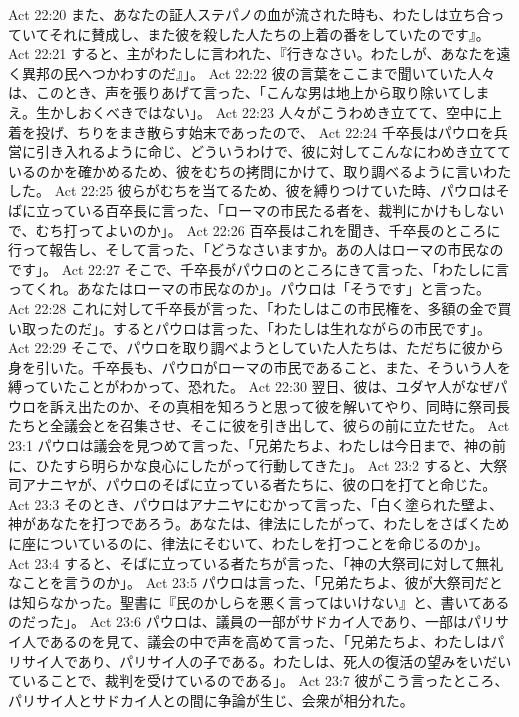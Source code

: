 Act 22:20  また、あなたの証人ステパノの血が流された時も、わたしは立ち合っていてそれに賛成し、また彼を殺した人たちの上着の番をしていたのです』。
Act 22:21  すると、主がわたしに言われた、『行きなさい。わたしが、あなたを遠く異邦の民へつかわすのだ』」。
Act 22:22  彼の言葉をここまで聞いていた人々は、このとき、声を張りあげて言った、「こんな男は地上から取り除いてしまえ。生かしおくべきではない」。
Act 22:23  人々がこうわめき立てて、空中に上着を投げ、ちりをまき散らす始末であったので、
Act 22:24  千卒長はパウロを兵営に引き入れるように命じ、どういうわけで、彼に対してこんなにわめき立てているのかを確かめるため、彼をむちの拷問にかけて、取り調べるように言いわたした。
Act 22:25  彼らがむちを当てるため、彼を縛りつけていた時、パウロはそばに立っている百卒長に言った、「ローマの市民たる者を、裁判にかけもしないで、むち打ってよいのか」。
Act 22:26  百卒長はこれを聞き、千卒長のところに行って報告し、そして言った、「どうなさいますか。あの人はローマの市民なのです」。
Act 22:27  そこで、千卒長がパウロのところにきて言った、「わたしに言ってくれ。あなたはローマの市民なのか」。パウロは「そうです」と言った。
Act 22:28  これに対して千卒長が言った、「わたしはこの市民権を、多額の金で買い取ったのだ」。するとパウロは言った、「わたしは生れながらの市民です」。
Act 22:29  そこで、パウロを取り調べようとしていた人たちは、ただちに彼から身を引いた。千卒長も、パウロがローマの市民であること、また、そういう人を縛っていたことがわかって、恐れた。
Act 22:30  翌日、彼は、ユダヤ人がなぜパウロを訴え出たのか、その真相を知ろうと思って彼を解いてやり、同時に祭司長たちと全議会とを召集させ、そこに彼を引き出して、彼らの前に立たせた。
Act 23:1  パウロは議会を見つめて言った、「兄弟たちよ、わたしは今日まで、神の前に、ひたすら明らかな良心にしたがって行動してきた」。
Act 23:2  すると、大祭司アナニヤが、パウロのそばに立っている者たちに、彼の口を打てと命じた。
Act 23:3  そのとき、パウロはアナニヤにむかって言った、「白く塗られた壁よ、神があなたを打つであろう。あなたは、律法にしたがって、わたしをさばくために座についているのに、律法にそむいて、わたしを打つことを命じるのか」。
Act 23:4  すると、そばに立っている者たちが言った、「神の大祭司に対して無礼なことを言うのか」。
Act 23:5  パウロは言った、「兄弟たちよ、彼が大祭司だとは知らなかった。聖書に『民のかしらを悪く言ってはいけない』と、書いてあるのだった」。
Act 23:6  パウロは、議員の一部がサドカイ人であり、一部はパリサイ人であるのを見て、議会の中で声を高めて言った、「兄弟たちよ、わたしはパリサイ人であり、パリサイ人の子である。わたしは、死人の復活の望みをいだいていることで、裁判を受けているのである」。
Act 23:7  彼がこう言ったところ、パリサイ人とサドカイ人との間に争論が生じ、会衆が相分れた。
